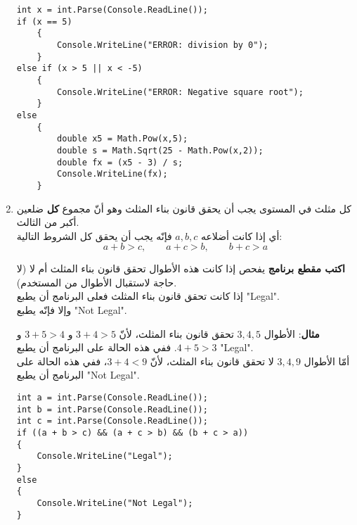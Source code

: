 ﻿\documentclass[14pt]{extarticle}
\begin{document}
\begin{enumerate}[itemsep=3em]
\ifwithsols
\begin{boxSolution}
\begin{english}
\begin{verbatim}
int x = int.Parse(Console.ReadLine());
if (x == 5)
    {
        Console.WriteLine("ERROR: division by 0");
    }
else if (x > 5 || x < -5)
    {
        Console.WriteLine("ERROR: Negative square root");
    }
else
    {
        double x5 = Math.Pow(x,5);
        double s = Math.Sqrt(25 - Math.Pow(x,2));
        double fx = (x5 - 3) / s;
        Console.WriteLine(fx);
    }
\end{verbatim}
\end{english}
\end{boxSolution}
\fi

\clearpage
\item
كل مثلث في المستوى يجب أن يحقق قانون بناء المثلث وهو أنّ مجموع \textbf{كل} ضلعين أكبر من الثالث. \\
 أي إذا كانت أضلاعه $a, b, c$ فإنّه يجب أن يحقق كل الشروط التالية:
\[ a + b > c ,  \qquad a + c > b ,  \qquad b + c > a \]

\textbf{اكتب مقطع برنامج} يفحص إذا كانت هذه الأطوال تحقق قانون بناء المثلث أم لا (لا حاجة لاستقبال الأطوال من المستخدم). \\
إذا كانت تحقق قانون بناء المثلث فعلى البرنامج أن يطبع \textenglish{"Legal"}. \\
وإلا فإنّه يطبع \textenglish{"Not Legal"}.

\textbf{مثال}: الأطوال $3, 4, 5$ تحقق قانون بناء المثلث، لأنّ $3 + 4 > 5$ و $3 + 5 > 4$ و $4 + 5 > 3$. ففي هذه الحالة على البرنامج أن يطبع \textenglish{"Legal"}. \\
أمّا الأطوال $3, 4, 9$ لا تحقق قانون بناء المثلث، لأنّ $3 + 4 < 9$، ففي هذه الحالة على البرنامج أن يطبع \textenglish{"Not Legal"}.

\ifwithsols
\begin{boxSolution}
\begin{english}
\begin{verbatim}
int a = int.Parse(Console.ReadLine());
int b = int.Parse(Console.ReadLine());
int c = int.Parse(Console.ReadLine());
if ((a + b > c) && (a + c > b) && (b + c > a))
{
    Console.WriteLine("Legal");
}
else
{
    Console.WriteLine("Not Legal");
}
\end{verbatim}
\end{english}
\end{boxSolution}
\fi


\end{enumerate}
\end{document}
